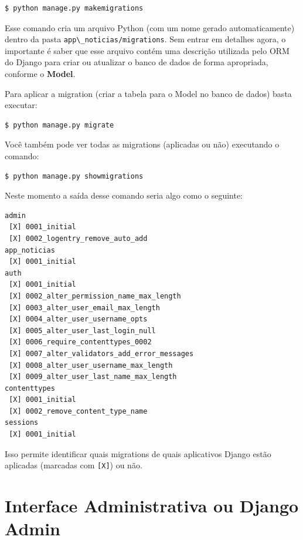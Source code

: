 \documentclass[brazil,a4paper,oneside,openright,parskip=full]{book}
\newcommand{\passthrough}[1]{#1}
\begin{document}
\begin{lstlisting}[language=sh, style=nonumber]
$ python manage.py makemigrations
\end{lstlisting}

Esse comando cria um arquivo Python (com um nome gerado automaticamente)
dentro da pasta \passthrough{\lstinline!app\_noticias/migrations!}. Sem
entrar em detalhes agora, o importante é saber que esse arquivo contém
uma descrição utilizada pelo ORM do Django para criar ou atualizar o
banco de dados de forma apropriada, conforme o \textbf{Model}.

Para aplicar a migration (criar a tabela para o Model no banco de dados)
basta executar:

\begin{lstlisting}[language=sh, style=nonumber]
$ python manage.py migrate
\end{lstlisting}

Você também pode ver todas as migrations (aplicadas ou não) executando o
comando:

\begin{lstlisting}[language=sh, style=nonumber]
$ python manage.py showmigrations
\end{lstlisting}

Neste momento a saída desse comando seria algo como o seguinte:

\begin{lstlisting}[style=nonumber]
admin
 [X] 0001_initial
 [X] 0002_logentry_remove_auto_add
app_noticias
 [X] 0001_initial
auth
 [X] 0001_initial
 [X] 0002_alter_permission_name_max_length
 [X] 0003_alter_user_email_max_length
 [X] 0004_alter_user_username_opts
 [X] 0005_alter_user_last_login_null
 [X] 0006_require_contenttypes_0002
 [X] 0007_alter_validators_add_error_messages
 [X] 0008_alter_user_username_max_length
 [X] 0009_alter_user_last_name_max_length
contenttypes
 [X] 0001_initial
 [X] 0002_remove_content_type_name
sessions
 [X] 0001_initial
\end{lstlisting}

Isso permite identificar quais migrations de quais aplicativos Django
estão aplicadas (marcadas com \passthrough{\lstinline![X]!}) ou não.

\hypertarget{interface-administrativa-ou-django-admin}{%
\section{Interface Administrativa ou Django
Admin}\label{interface-administrativa-ou-django-admin}}
\end{document}
